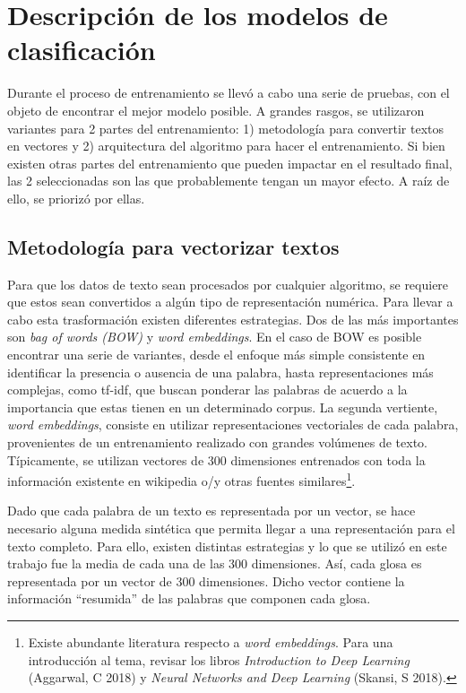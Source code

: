\documentclass[
  12pt,
  spanish,
]{article}
\begin{document}
\hypertarget{descripciuxf3n-de-los-modelos-de-clasificaciuxf3n}{%
\section{Descripción de los modelos de
clasificación}\label{descripciuxf3n-de-los-modelos-de-clasificaciuxf3n}}

Durante el proceso de entrenamiento se llevó a cabo una serie de
pruebas, con el objeto de encontrar el mejor modelo posible. A grandes
rasgos, se utilizaron variantes para 2 partes del entrenamiento: 1)
metodología para convertir textos en vectores y 2) arquitectura del
algoritmo para hacer el entrenamiento. Si bien existen otras partes del
entrenamiento que pueden impactar en el resultado final, las 2
seleccionadas son las que probablemente tengan un mayor efecto. A raíz
de ello, se priorizó por ellas.

\hypertarget{metodologuxeda-para-vectorizar-textos}{%
\subsection{Metodología para vectorizar
textos}\label{metodologuxeda-para-vectorizar-textos}}

Para que los datos de texto sean procesados por cualquier algoritmo, se
requiere que estos sean convertidos a algún tipo de representación
numérica. Para llevar a cabo esta trasformación existen diferentes
estrategias. Dos de las más importantes son \emph{bag of words (BOW)} y
\emph{word embeddings}. En el caso de BOW es posible encontrar una serie
de variantes, desde el enfoque más simple consistente en identificar la
presencia o ausencia de una palabra, hasta representaciones más
complejas, como tf-idf, que buscan ponderar las palabras de acuerdo a la
importancia que estas tienen en un determinado corpus. La segunda
vertiente, \emph{word embeddings}, consiste en utilizar representaciones
vectoriales de cada palabra, provenientes de un entrenamiento realizado
con grandes volúmenes de texto. Típicamente, se utilizan vectores de 300
dimensiones entrenados con toda la información existente en wikipedia
o/y otras fuentes similares\footnote{Existe abundante literatura
  respecto a \emph{word embeddings}. Para una introducción al tema,
  revisar los libros \emph{Introduction to Deep Learning} (Aggarwal, C
  2018) y \emph{Neural Networks and Deep Learning} (Skansi, S 2018).}.

Dado que cada palabra de un texto es representada por un vector, se hace
necesario alguna medida sintética que permita llegar a una
representación para el texto completo. Para ello, existen distintas
estrategias y lo que se utilizó en este trabajo fue la media de cada una
de las 300 dimensiones. Así, cada glosa es representada por un vector de
300 dimensiones. Dicho vector contiene la información ``resumida'' de
las palabras que componen cada glosa.
\end{document}
